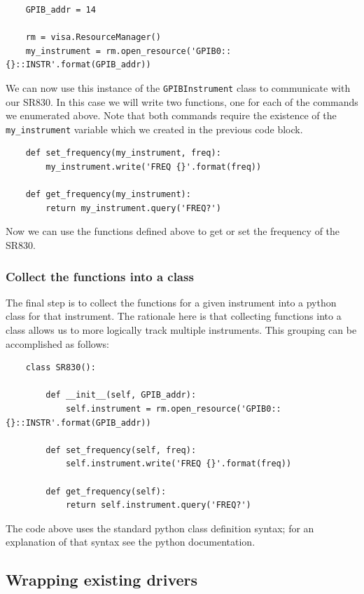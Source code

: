 \documentclass[edeposit,fullpage,draftthesis]{uiucthesis2009}
\begin{document}
\begin{appendices}
\begin{verbatim}
    GPIB_addr = 14
    
    rm = visa.ResourceManager()
    my_instrument = rm.open_resource('GPIB0::{}::INSTR'.format(GPIB_addr))
    \end{verbatim}
    We can now use this instance of the \texttt{GPIBInstrument} class to communicate with our SR830.
    In this case we will write two functions, one for each of the commands we enumerated above.
    Note that both commands require the existence of the \texttt{my\_instrument} variable which
    we created in the previous code block.
    \begin{verbatim}
    def set_frequency(my_instrument, freq):
        my_instrument.write('FREQ {}'.format(freq))
        
    def get_frequency(my_instrument):
        return my_instrument.query('FREQ?')
    \end{verbatim}
    Now we can use the functions defined above to get or set the frequency of the SR830.
    
    \subsubsection*{Collect the functions into a class}
    
    The final step is to collect the functions for a given instrument into a python class for that instrument.
    The rationale here is that collecting functions into a class allows us to more logically track multiple
    instruments. This grouping can be accomplished as follows:
    \begin{verbatim}
    class SR830():
    
        def __init__(self, GPIB_addr):
            self.instrument = rm.open_resource('GPIB0::{}::INSTR'.format(GPIB_addr))
            
        def set_frequency(self, freq):
            self.instrument.write('FREQ {}'.format(freq))
            
        def get_frequency(self):
            return self.instrument.query('FREQ?')
    \end{verbatim}
    The code above uses the standard python class definition syntax; for an explanation of that syntax see
    the python documentation.
    
    
    \subsection{Wrapping existing drivers}
    

\end{appendices}
\end{document}
